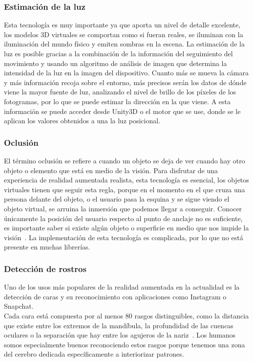 \subsubsection{Estimación de la luz}
Esta tecnología es muy importante ya que aporta un nivel de detalle excelente, los modelos 3D virtuales se comportan como si fueran reales, se iluminan con la iluminación del mundo físico y emiten sombras en la escena. La estimación de la luz es posible gracias a la combinación de la información del seguimiento del movimiento y usando un algoritmo de análisis de imagen que determina la intensidad de la luz en la imagen del dispositivo. Cuanto más se mueva la cámara y más información recoja sobre el entorno, más precisos serán los datos de dónde viene la mayor fuente de luz, analizando el nivel de brillo de los píxeles de los fotogramas, por lo que se puede estimar la dirección en la que viene. A esta información se puede acceder desde Unity3D o el motor que se use, donde se le aplican los valores obtenidos a una la luz posicional.

\subsubsection{Oclusión}
El término oclusión se refiere a cuando un objeto se deja de ver cuando hay otro objeto o elemento que está en medio de la visión. Para disfrutar de una experiencia de realidad aumentada realista, esta tecnología es esencial, los objetos virtuales tienen que seguir esta regla, porque en el momento en el que cruza una persona delante del objeto, o el usuario pasa la esquina y se sigue viendo el objeto virtual, se arruina la inmersión que podemos llegar a conseguir. Conocer únicamente la posición del usuario respecto al punto de anclaje no es suficiente, es importante saber si existe algún objeto o superficie en medio que nos impide la visión~\cite{articleOclusion}. La implementación de esta tecnología es complicada, por lo que no está presente en muchas librerías.

\subsubsection{Detección de rostros}
Uno de los usos más populares de la realidad aumentada en la actualidad es la detección de caras y su reconocimiento con aplicaciones como Instagram o Snapchat.\\

Cada cara está compuesta por al menos 80 rasgos distinguibles, como la distancia que existe entre los extremos de la mandíbula, la profundidad de las cuencas oculares o la separación que hay entre los agujeros de la nariz~\cite{BBC_FacialRecognition}. Los humanos somos especialmente buenos reconociendo estos rasgos porque tenemos una zona del cerebro dedicada específicamente a interiorizar patrones.\\

